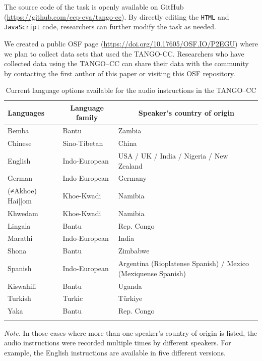 \documentclass[
  man,floatsintext]{apa7}
\begin{document}
The source code of the task is openly available on GitHub (\url{https://github.com/ccp-eva/tango-cc}).
By directly editing the \texttt{HTML} and \texttt{JavaScript} code, researchers can further modify the task as needed.

We created a public OSF page (\url{https://doi.org/10.17605/OSF.IO/P2EGU}) where we plan to collect data sets that used the TANGO-CC.
Researchers who have collected data using the TANGO--CC can share their data with the community by contacting the first author of this paper or visiting this OSF repository.

\begin{table}[tbp]

\begin{center}
\begin{threeparttable}

\caption{\label{tab:langtab}Current language options available for the audio instructions in the TANGO--CC}

\begin{tabular}{lll}
\toprule
Languages & \multicolumn{1}{c}{Language family} & \multicolumn{1}{c}{Speaker's country of origin}\\
\midrule
Bemba & Bantu & Zambia\\
Chinese & Sino-Tibetan & China\\
English & Indo-European & USA / UK / India / Nigeria / New Zealand\\
German & Indo-European & Germany\\
(≠Akhoe) Hai||om & Khoe-Kwadi & Namibia\\
Khwedam & Khoe-Kwadi & Namibia\\
Lingala & Bantu & Rep. Congo\\
Marathi & Indo-European & India\\
Shona & Bantu & Zimbabwe\\
Spanish & Indo-European & Argentina (Rioplatense Spanish) / Mexico (Mexiquense Spanish)\\
Kiswahili & Bantu & Uganda\\
Turkish & Turkic & Türkiye\\
Yaka & Bantu & Rep. Congo\\
\bottomrule
\addlinespace
\end{tabular}

\begin{tablenotes}[para]
\normalsize{\textit{Note.} In those cases where more than one speaker's country of origin is listed, the audio instructions were recorded multiple times by different speakers. For example, the English instructions are available in five different versions.}
\end{tablenotes}

\end{threeparttable}
\end{center}

\end{table}
\end{document}
